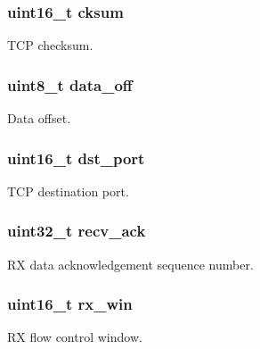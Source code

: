 \subsubsection[{cksum}]{\setlength{\rightskip}{0pt plus 5cm}uint16\+\_\+t cksum}\label{structtcp__hdr_a749687f86afcc33e9d390500910ef60d}
T\+C\+P checksum. \hypertarget{structtcp__hdr_abbef1ad55c650013d2e0034b6e51cf83}{}
\subsubsection[{data\+\_\+off}]{\setlength{\rightskip}{0pt plus 5cm}uint8\+\_\+t data\+\_\+off}\label{structtcp__hdr_abbef1ad55c650013d2e0034b6e51cf83}
Data offset. \hypertarget{structtcp__hdr_ae18defed4756b8c15e34718f51e86e55}{}
\subsubsection[{dst\+\_\+port}]{\setlength{\rightskip}{0pt plus 5cm}uint16\+\_\+t dst\+\_\+port}\label{structtcp__hdr_ae18defed4756b8c15e34718f51e86e55}
T\+C\+P destination port. \hypertarget{structtcp__hdr_ae801c1265636329c0552f28cee603098}{}
\subsubsection[{recv\+\_\+ack}]{\setlength{\rightskip}{0pt plus 5cm}uint32\+\_\+t recv\+\_\+ack}\label{structtcp__hdr_ae801c1265636329c0552f28cee603098}
R\+X data acknowledgement sequence number. \hypertarget{structtcp__hdr_ac137de069426e30b2277dc58b664c6fb}{}
\subsubsection[{rx\+\_\+win}]{\setlength{\rightskip}{0pt plus 5cm}uint16\+\_\+t rx\+\_\+win}\label{structtcp__hdr_ac137de069426e30b2277dc58b664c6fb}
R\+X flow control window. \hypertarget{structtcp__hdr_abd310b02bdd70401a746bd58b2a2ba66}{}
